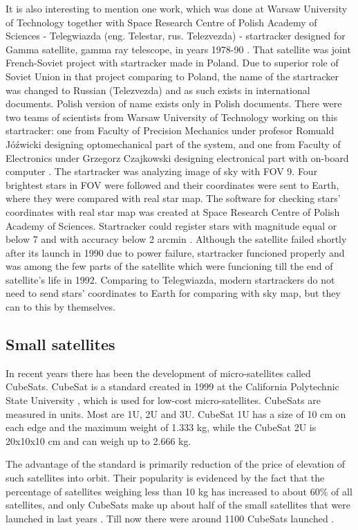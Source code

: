 \documentclass[12pt,a4paper,oneside]{article}
\begin{document}
It is also interesting to mention one work, which was done at Warsaw University of Technology together with Space Research Centre of Polish Academy of Sciences - Telegwiazda (eng. Telestar, rus. Telezvezda) - startracker designed for Gamma satellite, gamma ray telescope, in years 1978-90 \cite{gamma-satellite}. That satellite was joint French-Soviet project with startracker made in Poland. Due to superior role of Soviet Union in that project comparing to Poland, the name of the startracker was changed to Russian (Telezvezda) and as such exists in international documents. Polish version of name exists only in Polish documents. There were two teams of scientists from Warsaw University of Technology working on this startracker: one from Faculty of Precision Mechanics under profesor Romuald Jóźwicki designing optomechanical part of the system, and one from Faculty of Electronics under Grzegorz Czajkowski designing electronical part with on-board computer \cite{wut-space-research}. 
The startracker was analyzing image of sky with FOV 9\degree . Four brightest stars in FOV were followed and their coordinates were sent to Earth, where they were compared with real star map. The software for checking stars' coordinates with real star map was created at Space Research Centre of Polish Academy of Sciences. Startracker could register stars with magnitude equal or below 7 and with accuracy below 2 arcmin \cite{optical-devices-cbk}. Although the satellite failed shortly after its launch in 1990 due to power failure, startracker funcioned properly and was among the few parts of the satellite which were funcioning till the end of satellite's life in 1992. Comparing to Telegwiazda, modern startrackers do not need to send stars' coordinates to Earth for comparing with sky map, but they can to this by themselves.


\subsection{Small satellites}

In recent years there has been the development of micro-satellites called CubeSats. CubeSat is a standard created in 1999 at the California Polytechnic State University \cite{heidt2000cubesat}, which is used for low-cost micro-satellites. CubeSats are measured in units. Most are 1U, 2U and 3U. CubeSat 1U has a size of 10 cm on each edge and the maximum weight of 1.333 kg, while the CubeSat 2U is 20x10x10 cm and can weigh up to 2.666 kg.

The advantage of the standard is primarily reduction of the price of elevation of such satellites into orbit. Their popularity is evidenced by the fact that the percentage of satellites weighing less than 10 kg has increased to about 60\% of all satellites, and only CubeSats make up about half of the small satellites that were launched in last years \cite{swartwout2011brief}\cite{swartwout2013first}. Till now there were around 1100 CubeSats launched \cite{nanosats}.
\end{document}
